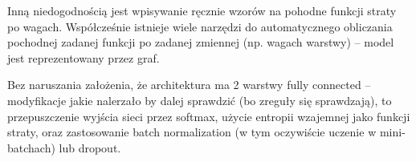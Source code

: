 \documentclass[a4paper]{article}
\begin{document}
Inną niedogodnością jest wpisywanie ręcznie wzorów na pohodne funkcji straty po wagach.
Współcześnie istnieje wiele narzędzi do automatycznego obliczania pochodnej
zadanej funkcji po zadanej zmiennej (np. wagach warstwy) --
model jest reprezentowany przez graf.

Bez naruszania założenia, że architektura ma 2 warstwy fully connected --
modyfikacje jakie nalerzało by dalej sprawdzić (bo zreguły się sprawdzają),
to przepuszczenie wyjścia sieci przez softmax, użycie entropii wzajemnej jako funkcji straty,
oraz zastosowanie batch normalization (w tym oczywiście uczenie w mini-batchach) lub dropout.
\end{document}
